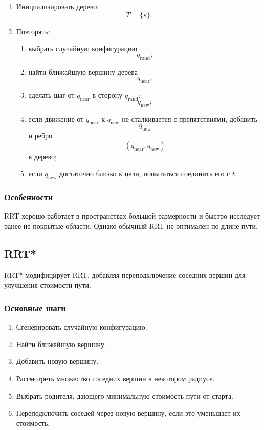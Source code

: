 \documentclass[12pt,a4paper]{article}
\begin{document}
\begin{enumerate}
    \item Инициализировать дерево:
    \[
    T=\{s\}.
    \]
    \item Повторять:
    \begin{enumerate}
        \item выбрать случайную конфигурацию
        \[
        q_{\text{rand}};
        \]
        \item найти ближайшую вершину дерева
        \[
        q_{\text{near}};
        \]
        \item сделать шаг от \(q_{\text{near}}\) в сторону \(q_{\text{rand}}\):
        \[
        q_{\text{new}};
        \]
        \item если движение от \(q_{\text{near}}\) к \(q_{\text{new}}\) не сталкивается с препятствиями, добавить
        \[
        q_{\text{new}}
        \]
        и ребро
        \[
        (q_{\text{near}},q_{\text{new}})
        \]
        в дерево;
        \item если \(q_{\text{new}}\) достаточно близко к цели, попытаться соединить его с \(t\).
    \end{enumerate}
\end{enumerate}

\subsubsection{Особенности}

RRT хорошо работает в пространствах большой размерности и быстро исследует ранее не покрытые области. Однако обычный RRT не оптимален по длине пути.

\subsection{RRT*}

RRT* модифицирует RRT, добавляя переподключение соседних вершин для улучшения стоимости пути.

\subsubsection{Основные шаги}

\begin{enumerate}
    \item Сгенерировать случайную конфигурацию.
    \item Найти ближайшую вершину.
    \item Добавить новую вершину.
    \item Рассмотреть множество соседних вершин в некотором радиусе.
    \item Выбрать родителя, дающего минимальную стоимость пути от старта.
    \item Переподключить соседей через новую вершину, если это уменьшает их стоимость.
\end{enumerate}
\end{document}

